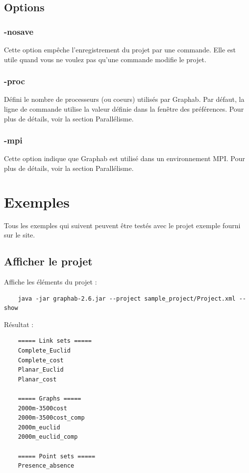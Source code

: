 \documentclass[a4paper,10pt]{report}
\begin{document}
\section{Options}
\subsection{-nosave}
Cette option empêche l'enregistrement du projet par une commande.
Elle est utile quand vous ne voulez pas qu'une commande modifie le projet.

\subsection{-proc}
Défini le nombre de processeurs (ou coeurs) utilisés par Graphab.
Par défaut, la ligne de commande utilise la valeur définie dans la fenêtre des préférences.
Pour plus de détails, voir la section Parallélisme.

\subsection{-mpi}
Cette option indique que Graphab est utilisé dans un environnement MPI. Pour plus de détails, voir la section Parallélisme.


\chapter{Exemples}
Tous les exemples qui suivent peuvent être testés avec le projet exemple fourni sur le site.

\section{Afficher le projet}
Affiche les éléments du projet :
\begin{Verbatim}
	java -jar graphab-2.6.jar --project sample_project/Project.xml --show
\end{Verbatim}
Résultat :
\begin{Verbatim}
	===== Link sets =====
	Complete_Euclid
	Complete_cost
	Planar_Euclid
	Planar_cost
	
	===== Graphs =====
	2000m-3500cost
	2000m-3500cost_comp
	2000m_euclid
	2000m_euclid_comp
	
	===== Point sets =====
	Presence_absence
\end{Verbatim}
\end{document}
